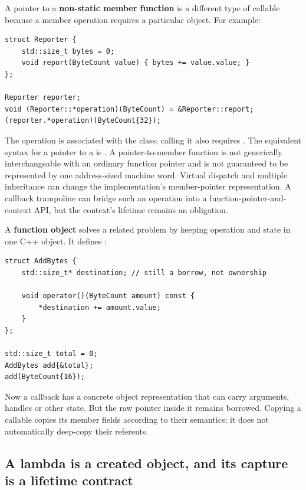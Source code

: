 A pointer to a \textbf{non-static member function} is a different type of callable because a member operation requires a particular object. For example:

\begin{verbatim}
struct Reporter {
    std::size_t bytes = 0;
    void report(ByteCount value) { bytes += value.value; }
};

Reporter reporter;
void (Reporter::*operation)(ByteCount) = &Reporter::report;
(reporter.*operation)(ByteCount{32});
\end{verbatim}

The operation is associated with the  class; calling it also requires . The equivalent syntax for a pointer to a  is . A pointer-to-member function is not generically interchangeable with an ordinary function pointer and is not guaranteed to be represented by one address-sized machine word. Virtual dispatch and multiple inheritance can change the implementation's member-pointer representation. A callback trampoline can bridge such an operation into a function-pointer-and-context API, but the context's lifetime remains an obligation.

A \textbf{function object} solves a related problem by keeping operation and state in one C++ object. It defines :

\begin{verbatim}
struct AddBytes {
    std::size_t* destination; // still a borrow, not ownership

    void operator()(ByteCount amount) const {
        *destination += amount.value;
    }
};

std::size_t total = 0;
AddBytes add{&total};
add(ByteCount{16});
\end{verbatim}

Now a callback has a concrete object representation that can carry arguments, handles or other state. But the raw pointer inside it remains borrowed. Copying a callable copies its member fields according to their semantics; it does not automatically deep-copy their referents.

\subsection{A lambda is a created object, and its capture is a lifetime contract}\label{05-engine-i-ch004-a-lambda-is-a-created-object-and-its-capture-is-a-lifetime-contract}

